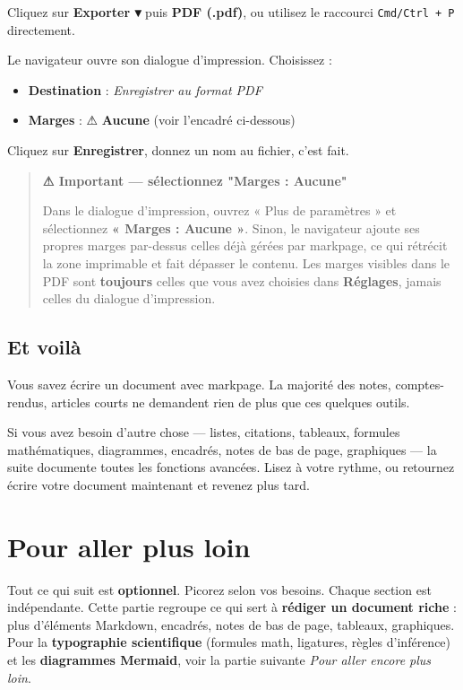 \documentclass[11pt,a4paper]{article}
\theoremstyle{definition}
\begin{document}
Cliquez sur \textbf{Exporter ▾} puis \textbf{PDF (.pdf)}, ou utilisez le
raccourci \texttt{Cmd/Ctrl + P} directement.


Le navigateur ouvre son dialogue d'impression. Choisissez :


\begin{itemize}
  \item \textbf{Destination} : \emph{Enregistrer au format PDF}
  \item \textbf{Marges} : ⚠ \textbf{Aucune} (voir l'encadré ci-dessous)
\end{itemize}


Cliquez sur \textbf{Enregistrer}, donnez un nom au fichier, c'est fait.


\begin{quote}
\textbf{⚠ Important — sélectionnez "Marges : Aucune"}


Dans le dialogue d'impression, ouvrez « Plus de paramètres » et
sélectionnez \textbf{« Marges : Aucune »}. Sinon, le navigateur ajoute
ses propres marges par-dessus celles déjà gérées par markpage, ce
qui rétrécit la zone imprimable et fait dépasser le contenu. Les
marges visibles dans le PDF sont \textbf{toujours} celles que vous
avez choisies dans \textbf{Réglages}, jamais celles du dialogue
d'impression.
\end{quote}


\subsection{Et voilà}

Vous savez écrire un document avec markpage. La majorité des notes,
comptes-rendus, articles courts ne demandent rien de plus que ces
quelques outils.


Si vous avez besoin d'autre chose — listes, citations, tableaux,
formules mathématiques, diagrammes, encadrés, notes de bas de page,
graphiques — la suite documente toutes les fonctions avancées. Lisez
à votre rythme, ou retournez écrire votre document maintenant et
revenez plus tard.



\noindent\hrulefill\par


\section{Pour aller plus loin}

Tout ce qui suit est \textbf{optionnel}. Picorez selon vos besoins. Chaque
section est indépendante. Cette partie regroupe ce qui sert à
\textbf{rédiger un document riche} : plus d'éléments Markdown, encadrés,
notes de bas de page, tableaux, graphiques. Pour la \textbf{typographie
scientifique} (formules math, ligatures, règles d'inférence) et les
\textbf{diagrammes Mermaid}, voir la partie suivante \emph{Pour aller encore
plus loin}.
\end{document}
